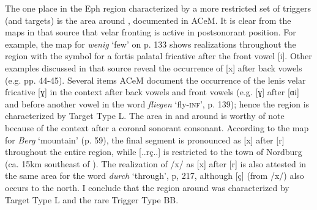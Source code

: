 The one place in the Eph region characterized by a more restricted set of triggers (and targets) is the area around , documented in ACeM. It is clear from the maps in that source that velar fronting is active in postsonorant position. For example, the map for \textit{wenig} ‘few’ on p. 133 shows realizations throughout the region with the symbol for a fortis palatal fricative after the front vowel [i]. Other examples discussed in that source reveal the occurrence of [x] after back vowels (e.g. pp. 44-45). Several items ACeM document the occurrence of the lenis velar fricative [ɣ] in the context after back vowels and front vowels (e.g. [ɣ] after [ɑi] and before another vowel in the word \textit{fliegen} ‘fly-\textsc{inf}’, p. 139); hence the region is characterized by Target Type L. The area in and around  is worthy of note because of the context after a coronal sonorant consonant. According to the map for \textit{Berg} ‘mountain’ (p. 59), the final segment is pronounced as [x] after [r] throughout the entire region, while [..rç..] is restricted to the town of Nordburg (ca. 15km southeast of ). The realization of /x/ as [x] after [r] is also attested in the same area for the word \textit{durch} ‘through’, p, 217, although [ç] (from /x/) also occurs to the north. I conclude that the region around  was characterized by Target Type L and the rare Trigger Type BB.

